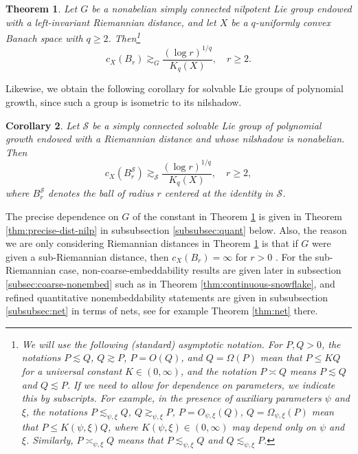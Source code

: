 \documentclass[11pt,reqno]{amsart}
\newtheorem{theorem}{Theorem}
\newtheorem{corollary}[theorem]{Corollary}
\newcommand{\1}{\mathbf 1}
\begin{document}
\begin{theorem}\label{mainthm:nilpotentdistortion}
Let $G$ be a nonabelian simply connected nilpotent Lie group endowed with a left-invariant Riemannian distance, and let $X$ be a $q$-uniformly convex Banach space with $q\ge 2$. Then\footnote{We will use the following (standard) asymptotic notation. For $P, Q>0$, the notations $P\lesssim Q$, $Q\gtrsim P$, $P=O\left(Q\right)$, and $Q=\Omega\left(P\right)$ mean that $P\le KQ$ for a universal constant $K\in \left(0,\infty\right)$, and the notation $P\asymp Q$ means $P\lesssim Q$ and $Q\lesssim P$. If we need to allow for dependence on parameters, we indicate this by subscripts. For example, in the presence of auxiliary parameters $\psi$ and $\xi$, the notations $P\lesssim_{\psi,\xi}Q$, $Q\gtrsim_{\psi,\xi}P$, $P=O_{\psi,\xi}\left(Q\right)$, $Q=\Omega_{\psi,\xi}\left(P\right)$ mean that $P\le K\left(\psi,\xi\right)Q$, where $K\left(\psi,\xi\right)\in \left(0,\infty\right)$ may depend only on $\psi$ and $\xi$. Similarly, $P\asymp_{\psi,\xi}Q$ means that $P\lesssim_{\psi,\xi}Q$ and $Q\lesssim_{\psi,\xi}P$.}
\[
c_X\left(B_r\right)\gtrsim_G \frac{\left(\log r\right)^{1/q}}{K_q\left(X\right)},\quad r\ge 2.
\]
\end{theorem}
Likewise, we obtain the following corollary for solvable Lie groups of polynomial growth, since such a group is isometric to its nilshadow.
\begin{corollary}
Let $\mathcal{S}$ be a simply connected solvable Lie group of polynomial growth endowed with a Riemannian distance and whose nilshadow is nonabelian. Then
\[
c_X\left(B^{\mathcal{S}}_r\right)\gtrsim_\mathcal{S} \frac{\left(\log r\right)^{1/q}}{K_q\left(X\right)},\quad r\ge 2,
\]
where $B^{\mathcal{S}}_r$ denotes the ball of radius $r$ centered at the identity in $\mathcal{S}$.
\end{corollary}
The precise dependence on $G$ of the constant in Theorem \ref{mainthm:nilpotentdistortion} is given in Theorem \ref{thm:precise-dist-nilp} in subsubsection \ref{subsubsec:quant} below. Also, the reason we are only considering Riemannian distances in Theorem \ref{mainthm:nilpotentdistortion} is that if $G$ were given a sub-Riemannian distance, then $c_X\left(B_r\right)=\infty$ for $r>0$ \cite[Theorem 1.4]{huang2020non}. For the sub-Riemannian case, non-coarse-embeddability results are given later in subsection \ref{subsec:coarse-nonembed} such as in Theorem \ref{thm:continuous-snowflake}, and refined quantitative nonembeddability statements are given in subsubsection \ref{subsubsec:net} in terms of nets, see for example Theorem \ref{thm:net} there.
\end{document}
